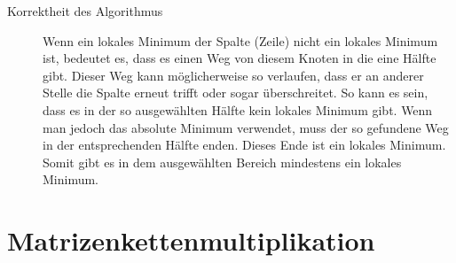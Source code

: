 \documentclass[a4paper,10pt]{article}
\begin{document}
\begin{enumerate}
\begin{description}
	\item[Korrektheit des Algorithmus] Wenn ein lokales Minimum der Spalte (Zeile) nicht ein lokales Minimum ist, bedeutet es, dass es einen Weg von diesem Knoten in die eine Hälfte gibt. Dieser Weg kann möglicherweise so verlaufen, dass er an anderer Stelle die Spalte erneut trifft oder sogar überschreitet. So kann es sein, dass es in der so ausgewählten Hälfte kein lokales Minimum gibt. Wenn man jedoch das absolute Minimum verwendet, muss der so gefundene Weg in der entsprechenden Hälfte enden. Dieses Ende ist ein lokales Minimum. Somit gibt es in dem ausgewählten Bereich mindestens ein lokales Minimum.
\end{description}
\end{enumerate}

\section{Matrizenkettenmultiplikation}
\end{document}
